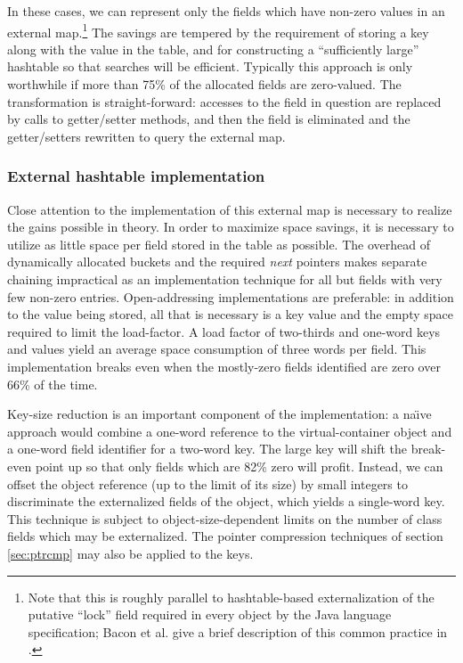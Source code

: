 \documentclass[preprint]{acmconf}
\begin{document}
In these cases, we can represent only the fields which have non-zero
values in an external map.\footnote{Note that this is roughly parallel
  to hashtable-based externalization of the putative ``lock'' field
  required in every object by the Java language specification; Bacon
  et al. give a brief description of this common
  practice in \cite{bacon98}.}
The savings are tempered by the requirement of storing a key along
with the value in the table, and for constructing a ``sufficiently
large'' hashtable so that searches will be efficient.  Typically this
approach is only worthwhile if more than 75\% of the allocated fields
are zero-valued.  The transformation is straight-forward: accesses to
the field in question are replaced by calls to getter/setter methods,
and then the field is eliminated and the getter/setters rewritten
to query the external map.

\subsubsection{External hashtable implementation}
Close attention to the implementation of this external map is
necessary to realize the gains possible in theory.  In order to
maximize space savings, it is necessary to utilize as little space
per field stored in the table as possible.  The overhead of
dynamically allocated buckets and the required {\it next} pointers
makes separate chaining impractical as an implementation technique
for all but fields with very few non-zero entries.  Open-addressing
implementations are preferable: in addition to the value being stored,
all that is necessary is a key value and the empty space required to
limit the load-factor.  A load factor of two-thirds and one-word keys
and values yield an average space consumption of three words per
field.  This implementation breaks even when the mostly-zero fields
identified are zero over 66\% of the time.

Key-size reduction is an important component of the implementation:
a na{\"\i}ve approach
would combine a one-word reference to the virtual-container object and a
one-word field identifier for a two-word key.  The large key will
shift the break-even point up so that only fields which are 82\% zero
will profit.  Instead, we can offset the
object reference (up to the limit of its size) by small integers
to discriminate the externalized fields of the object, which yields
a single-word key.  This technique is
subject to object-size-dependent limits on the number
of class fields which may be externalized.  The pointer compression
techniques of section \ref{sec:ptrcmp} may also be applied to the
keys.
\end{document}
